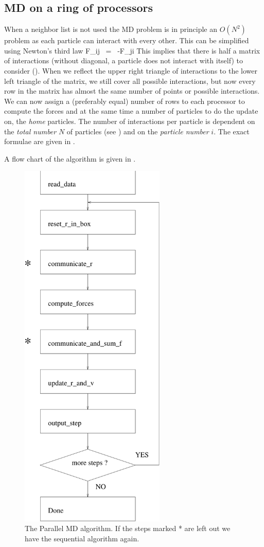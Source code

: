 \subsection{MD on a ring of processors}
When a neighbor list is not used the MD problem is in principle an $O(N^2)$ 
problem as each particle can interact
with every other. This can be simplified using Newton's third law
\beq
F_{ij}  ~=~     -F_{ji}
\label{eqn:Newt3}
\eeq
This implies that there is half a matrix of interactions (without diagonal, 
a particle does not interact with itself) to consider ().
When we reflect the upper right triangle of interactions to the lower
left triangle of the matrix, we still cover all possible interactions,
but now every row in the matrix has almost the same number of points
or possible interactions.  We can now assign a (preferably equal)
number of rows to each processor to compute the forces and at the same
time a number of particles to do the update on, the {\em home}
particles. The number of interactions per particle is dependent on the
{\em total number} $N$ of particles (see ) and on the
{\em particle number} $i$.  The exact formulae are given in
.

A flow chart of the algorithm is given in .
\begin{figure}
\centerline{\includegraphics[height=18cm]{plots/mdpar}}
\caption[The Parallel MD algorithm.]{The Parallel MD algorithm. If
the steps marked * are left out we have the sequential algorithm
again.}
\label{fig:mdpar}
\end{figure}
\vfill

